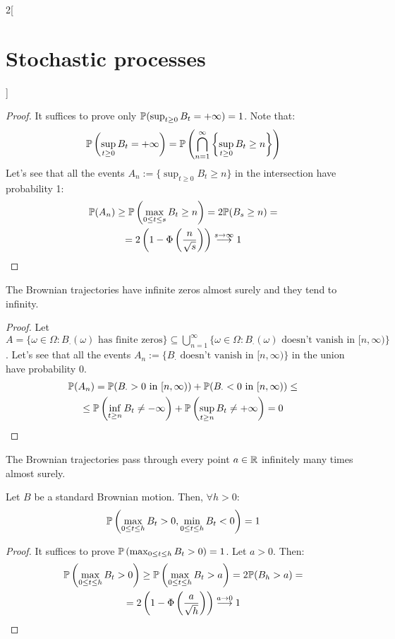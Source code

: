 \documentclass[../../../main_math.tex]{subfiles}
\begin{document}
\begin{multicols}{2}[\section{Stochastic processes}]
  \begin{proof}
    It suffices to prove only $\mathbb{P}(\sup_{t\geq 0}B_t=+\infty)=1$. Note that:
    $$
      \mathbb{P}\left(\sup_{t\geq 0}B_t=+\infty\right)=\mathbb{P}\left(\bigcap_{n=1}^\infty\left\{\sup_{t\geq 0}B_t\geq n\right\}\right)
    $$
    Let's see that all the events $A_n:=\{\sup_{t\geq 0}B_t\geq n\}$ in the intersection have probability 1:
    \begin{multline*}
      \mathbb{P}(A_n)\geq \mathbb{P}\left(\max_{0\leq t\leq s} B_t\geq n\right)=2\mathbb{P}(B_s\geq n)=\\=2\left(1-\Phi\left(\frac{n}{\sqrt{s}}\right)\right)\overset{s\to\infty}{\longrightarrow} 1
    \end{multline*}
  \end{proof}
  \begin{corollary}
    The Brownian trajectories have infinite zeros almost surely and they tend to infinity.
  \end{corollary}
  \begin{proof}
    Let $A=\{\omega\in\Omega:B_{\cdot}(\omega)\text{ has finite zeros}\}\subseteq \bigcup_{n=1}^\infty\{\omega\in\Omega:B_{\cdot}(\omega)\text{ doesn't vanish in $[n,\infty)$}\}$. Let's see that all the events $A_n:=\{B_{\cdot}\text{ doesn't vanish in $[n,\infty)$}\}$ in the union have probability 0.
    \begin{multline*}
      \mathbb{P}(A_n)=\mathbb{P}(B_{\cdot}>0\text{ in $[n,\infty)$})+\mathbb{P}(B_{\cdot}<0\text{ in $[n,\infty)$})\leq\\\leq \mathbb{P}\left(\inf_{t\geq n}B_t\ne-\infty\right)+\mathbb{P}\left(\sup_{t\geq n}B_t\ne+\infty\right)=0
    \end{multline*}
  \end{proof}
  \begin{corollary}
    The Brownian trajectories pass through every point $a\in\mathbb{R}$ infinitely many times almost surely.
  \end{corollary}
  \begin{proposition}
    Let $B$ be a standard Brownian motion. Then, $\forall h>0$:
    $$
      \mathbb{P}\left(\max_{0\leq t\leq h}B_t>0,\min_{0\leq t\leq h}B_t<0\right)=1
    $$
  \end{proposition}
  \begin{proof}
    It suffices to prove $\mathbb{P}\left(\max_{0\leq t\leq h}B_t>0\right)=1$. Let $a>0$. Then:
    \begin{multline*}
      \Prob\left(\max_{0\leq t\leq h}B_t>0\right)\geq \Prob\left(\max_{0\leq t\leq h}B_t>a\right) =2\Prob(B_h>a)=\\=2\left(1-\Phi\left(\frac{a}{\sqrt{h}}\right)\right)\overset{a\to 0}{\longrightarrow} 1

\end{multline*}
\end{proof}
\end{multicols}
\end{document}
